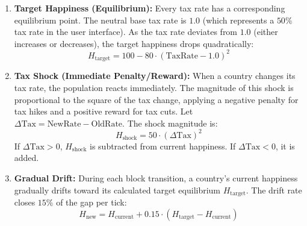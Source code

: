 \begin{enumerate}
    \item \textbf{Target Happiness (Equilibrium):} Every tax rate has a corresponding equilibrium point. The neutral base tax rate is $1.0$ (which represents a $50\%$ tax rate in the user interface). As the tax rate deviates from $1.0$ (either increases or decreases), the target happiness drops quadratically:
    \begin{equation}
    H_{\text{target}} = 100 - 80 \cdot (\text{TaxRate} - 1.0)^2
    \end{equation}

    \item \textbf{Tax Shock (Immediate Penalty/Reward):} When a country changes its tax rate, the population reacts immediately. The magnitude of this shock is proportional to the square of the tax change, applying a negative penalty for tax hikes and a positive reward for tax cuts. Let $\Delta \text{Tax} = \text{NewRate} - \text{OldRate}$. The shock magnitude is:
    \begin{equation}
    H_{\text{shock}} = 50 \cdot (\Delta \text{Tax})^2
    \end{equation}
    If $\Delta \text{Tax} > 0$, $H_{\text{shock}}$ is subtracted from current happiness. If $\Delta \text{Tax} < 0$, it is added.

    \item \textbf{Gradual Drift:} During each block transition, a country's current happiness gradually drifts toward its calculated target equilibrium $H_{\text{target}}$. The drift rate closes $15\%$ of the gap per tick:
    \begin{equation}
    H_{\text{new}} = H_{\text{current}} + 0.15 \cdot (H_{\text{target}} - H_{\text{current}})
    \end{equation}
\end{enumerate}
